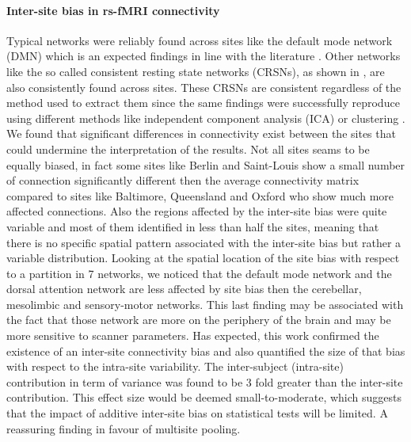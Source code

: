 \documentclass[authoryear]{elsarticle}
\begin{document}
\paragraph{Inter-site bias in rs-fMRI connectivity}  Typical networks were reliably found across sites like the default mode network (DMN) which is an expected findings in line with the literature \citep{Zhang2012,Damoiseaux2006,Bellec2010c,Buckner2008,Fransson2005,Fransson2006}. Other networks like the so called consistent resting state networks (CRSNs), as shown in \cite{Damoiseaux2006, Bellec2010c, Dansereau2014}, are also consistently found across sites. These CRSNs are consistent regardless of the method used to extract them since the same findings were successfully reproduce using different methods like independent component analysis (ICA) \citep{Damoiseaux2006} or clustering \citep{Bellec2010c}. We found that significant differences in connectivity exist between the sites that could undermine the interpretation of the results. Not all sites seams to be equally biased, in fact some sites like Berlin and Saint-Louis show a small number of connection significantly different then the average connectivity matrix compared to sites like Baltimore, Queensland and Oxford who show much more affected connections. Also the regions affected by the inter-site bias were quite variable and most of them identified in less than half the sites, meaning that there is no specific spatial pattern associated with the inter-site bias but rather a variable distribution. Looking at the spatial location of the site bias with respect to a partition in 7 networks, we noticed that the default mode network and the dorsal attention network are less affected by site bias then the cerebellar, mesolimbic and sensory-motor networks. This last finding may be associated with the fact that those network are more on the periphery of the brain and may be more sensitive to scanner parameters. Has expected, this work confirmed the existence of an inter-site connectivity bias and also quantified the size of that bias with respect to the intra-site variability. The inter-subject (intra-site) contribution in term of variance was found to be 3 fold greater than the inter-site contribution. This effect size would be deemed small-to-moderate, which suggests that the impact of additive inter-site bias on statistical tests will be limited. A reassuring finding in favour of multisite pooling.\\
\end{document}
